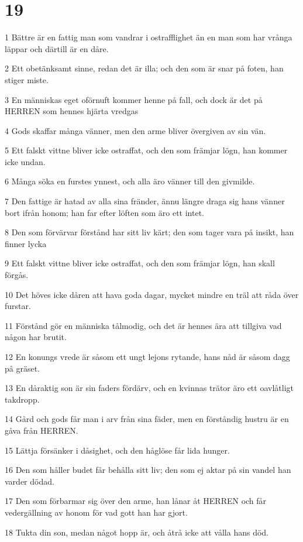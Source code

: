 \chapter{19}

\par 1 Bättre är en fattig man som vandrar i ostrafflighet än en man som har vrånga läppar och därtill är en dåre.
\par 2 Ett obetänksamt sinne, redan det är illa; och den som är snar på foten, han stiger miste.
\par 3 En människas eget oförnuft kommer henne på fall, och dock är det på HERREN som hennes hjärta vredgas
\par 4 Gods skaffar många vänner, men den arme bliver övergiven av sin vän.
\par 5 Ett falskt vittne bliver icke ostraffat, och den som främjar lögn, han kommer icke undan.
\par 6 Många söka en furstes ynnest, och alla äro vänner till den givmilde.
\par 7 Den fattige är hatad av alla sina fränder, ännu längre draga sig hans vänner bort ifrån honom; han far efter löften som äro ett intet.
\par 8 Den som förvärvar förstånd har sitt liv kärt; den som tager vara på insikt, han finner lycka
\par 9 Ett falskt vittne bliver icke ostraffat, och den som främjar lögn, han skall förgås.
\par 10 Det höves icke dåren att hava goda dagar, mycket mindre en träl att råda över furstar.
\par 11 Förstånd gör en människa tålmodig, och det är hennes ära att tillgiva vad någon har brutit.
\par 12 En konungs vrede är såsom ett ungt lejons rytande, hans nåd är såsom dagg på gräset.
\par 13 En dåraktig son är sin faders fördärv, och en kvinnas trätor äro ett oavlåtligt takdropp.
\par 14 Gård och gods får man i arv från sina fäder, men en förståndig hustru är en gåva från HERREN.
\par 15 Lättja försänker i dåsighet, och den håglöse får lida hunger.
\par 16 Den som håller budet får behålla sitt liv; den som ej aktar på sin vandel han varder dödad.
\par 17 Den som förbarmar sig över den arme, han lånar åt HERREN och får vedergällning av honom för vad gott han har gjort.
\par 18 Tukta din son, medan något hopp är, och åtrå icke att vålla hans död.
